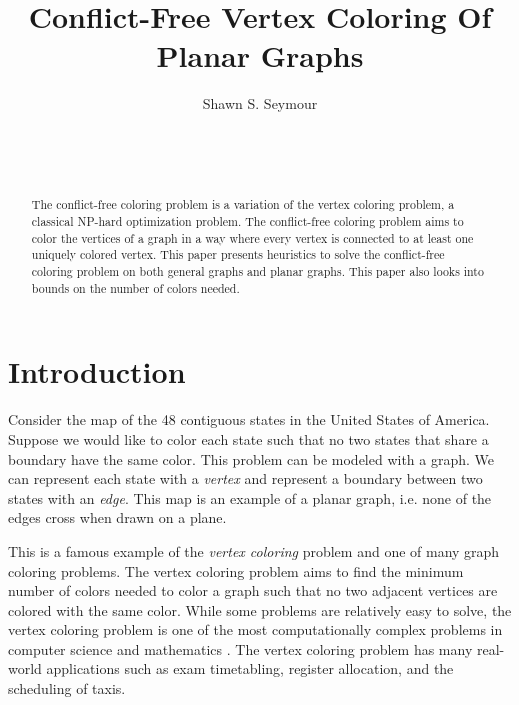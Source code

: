 \documentclass{sig-alternate}
\begin{document}

\title{Conflict-Free Vertex Coloring Of Planar Graphs}


\author{
\alignauthor
Shawn S. Seymour\\
	\\
	\\
	\\
}

\maketitle
\begin{abstract}
The conflict-free coloring problem is a variation of the vertex coloring problem, a classical NP-hard optimization problem. The conflict-free coloring problem aims to color the vertices of a graph in a way where every vertex is connected to at least one uniquely colored vertex. This paper presents heuristics to solve the conflict-free coloring problem on both general graphs and planar graphs. This paper also looks into bounds on the number of colors needed.
\end{abstract}

\section{Introduction}
\label{sec:introduction}

Consider the map of the 48 contiguous states in the United States of America. Suppose we would like to color each state such that no two states that share a boundary have the same color. This problem can be modeled with a graph. We can represent each state with a \emph{vertex} and represent a boundary between two states with an \emph{edge}. This map is an example of a planar graph, i.e. none of the edges cross when drawn on a plane.

This is a famous example of the \emph{vertex coloring} problem and one of many graph coloring problems. The vertex coloring problem aims to find the minimum number of colors needed to color a graph such that no two adjacent vertices are colored with the same color. While some problems are relatively easy to solve, the vertex coloring problem is one of the most computationally complex problems in computer science and mathematics \cite{bondy1976graph}. The vertex coloring problem has many real-world applications such as exam timetabling, register allocation, and the scheduling of taxis.
\end{document}
